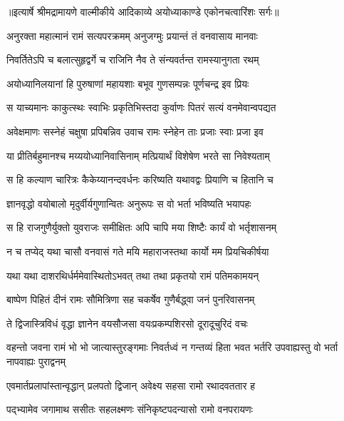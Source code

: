 {॥इत्यार्षे श्रीमद्रामायणे वाल्मीकीये आदिकाव्ये अयोध्याकाण्डे एकोनचत्वारिंशः सर्गः॥}


\twolineshloka
{अनुरक्ता महात्मानं रामं सत्यपरक्रमम्}
{अनुजग्मुः प्रयान्तं तं वनवासाय मानवाः} %

\twolineshloka
{निवर्तितेऽपि च बलात्सुहृद्वर्गे च राजिनि}
{नैव ते संन्यवर्तन्त रामस्यानुगता रथम्} %

\twolineshloka
{अयोध्यानिलयानां हि पुरुषाणां महायशाः}
{बभूव गुणसम्पन्नः पूर्णचन्द्र इव प्रियः} %

\twolineshloka
{स याच्यमानः काकुत्स्थः स्वाभिः प्रकृतिभिस्तदा}
{कुर्वाणः पितरं सत्यं वनमेवान्वपद्यत} %

\twolineshloka
{अवेक्षमाणः सस्नेहं चक्षुषा प्रपिबन्निव}
{उवाच रामः स्नेहेन ताः प्रजाः स्वाः प्रजा इव} %

\twolineshloka
{या प्रीतिर्बहुमानश्च मय्ययोध्यानिवासिनाम्}
{मत्प्रियार्थं विशेषेण भरते सा निवेश्यताम्} %

\twolineshloka
{स हि कल्याण चारित्रः कैकेय्यानन्दवर्धनः}
{करिष्यति यथावद्वः प्रियाणि च हितानि च} %

\twolineshloka
{ज्ञानवृद्धो वयोबालो मृदुर्वीर्यगुणान्वितः}
{अनुरूपः स वो भर्ता भविष्यति भयापहः} %

\twolineshloka
{स हि राजगुणैर्युक्तो युवराजः समीक्षितः}
{अपि चापि मया शिष्टैः कार्यं वो भर्तृशासनम्} %

\twolineshloka
{न च तप्येद् यथा चासौ वनवासं गते मयि}
{महाराजस्तथा कार्यो मम प्रियचिकीर्षया} %

\twolineshloka
{यथा यथा दाशरथिर्धर्ममेवास्थितोऽभवत्}
{तथा तथा प्रकृतयो रामं पतिमकामयन्} %

\twolineshloka
{बाष्पेण पिहितं दीनं रामः सौमित्रिणा सह}
{चकर्षेव गुणैर्बद्ध्वा जनं पुनरिवासनम्} %

\twolineshloka
{ते द्विजास्त्रिविधं वृद्धा ज्ञानेन वयसौजसा}
{वयःप्रकम्पशिरसो दूरादूचुरिदं वचः} %

\threelineshloka
{वहन्तो जवना रामं भो भो जात्यास्तुरङ्गमाः}
{निवर्तध्वं न गन्तव्यं हिता भवत भर्तरि}
{उपवाह्यस्तु वो भर्ता नापवाह्यः पुराद्वनम्} %

\twolineshloka
{एवमार्तप्रलापांस्तान्वृद्धान् प्रलपतो द्विजान्}
{अवेक्ष्य सहसा रामो रथादवततार ह} %

\twolineshloka
{पद्भ्यामेव जगामाथ ससीतः सहलक्ष्मणः}
{संनिकृष्टपदन्यासो रामो वनपरायणः} %

